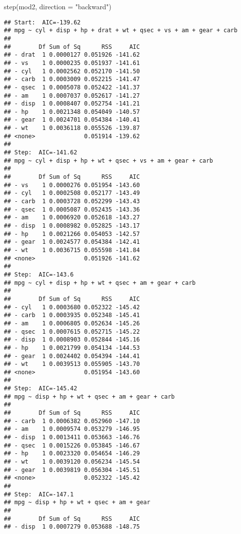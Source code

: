 \documentclass[
]{article}
\newenvironment{Shaded}{\begin{snugshade}}{\end{snugshade}}
\newcommand{\AttributeTok}[1]{\textcolor[rgb]{0.77,0.63,0.00}{#1}}
\newcommand{\FunctionTok}[1]{\textcolor[rgb]{0.00,0.00,0.00}{#1}}
\newcommand{\NormalTok}[1]{#1}
\newcommand{\StringTok}[1]{\textcolor[rgb]{0.31,0.60,0.02}{#1}}
\begin{document}
\begin{Shaded}
\begin{Highlighting}[]
\FunctionTok{step}\NormalTok{(mod2, }\AttributeTok{direction =} \StringTok{"backward"}\NormalTok{)}
\end{Highlighting}
\end{Shaded}

\begin{verbatim}
## Start:  AIC=-139.62
## mpg ~ cyl + disp + hp + drat + wt + qsec + vs + am + gear + carb
## 
##        Df Sum of Sq      RSS     AIC
## - drat  1 0.0000127 0.051926 -141.62
## - vs    1 0.0000235 0.051937 -141.61
## - cyl   1 0.0002562 0.052170 -141.50
## - carb  1 0.0003009 0.052215 -141.47
## - qsec  1 0.0005078 0.052422 -141.37
## - am    1 0.0007037 0.052617 -141.27
## - disp  1 0.0008407 0.052754 -141.21
## - hp    1 0.0021348 0.054049 -140.57
## - gear  1 0.0024701 0.054384 -140.41
## - wt    1 0.0036118 0.055526 -139.87
## <none>              0.051914 -139.62
## 
## Step:  AIC=-141.62
## mpg ~ cyl + disp + hp + wt + qsec + vs + am + gear + carb
## 
##        Df Sum of Sq      RSS     AIC
## - vs    1 0.0000276 0.051954 -143.60
## - cyl   1 0.0002508 0.052177 -143.49
## - carb  1 0.0003728 0.052299 -143.43
## - qsec  1 0.0005087 0.052435 -143.36
## - am    1 0.0006920 0.052618 -143.27
## - disp  1 0.0008982 0.052825 -143.17
## - hp    1 0.0021266 0.054053 -142.57
## - gear  1 0.0024577 0.054384 -142.41
## - wt    1 0.0036715 0.055598 -141.84
## <none>              0.051926 -141.62
## 
## Step:  AIC=-143.6
## mpg ~ cyl + disp + hp + wt + qsec + am + gear + carb
## 
##        Df Sum of Sq      RSS     AIC
## - cyl   1 0.0003680 0.052322 -145.42
## - carb  1 0.0003935 0.052348 -145.41
## - am    1 0.0006805 0.052634 -145.26
## - qsec  1 0.0007615 0.052715 -145.22
## - disp  1 0.0008903 0.052844 -145.16
## - hp    1 0.0021799 0.054134 -144.53
## - gear  1 0.0024402 0.054394 -144.41
## - wt    1 0.0039513 0.055905 -143.70
## <none>              0.051954 -143.60
## 
## Step:  AIC=-145.42
## mpg ~ disp + hp + wt + qsec + am + gear + carb
## 
##        Df Sum of Sq      RSS     AIC
## - carb  1 0.0006382 0.052960 -147.10
## - am    1 0.0009574 0.053279 -146.95
## - disp  1 0.0013411 0.053663 -146.76
## - qsec  1 0.0015226 0.053845 -146.67
## - hp    1 0.0023320 0.054654 -146.29
## - wt    1 0.0039120 0.056234 -145.54
## - gear  1 0.0039819 0.056304 -145.51
## <none>              0.052322 -145.42
## 
## Step:  AIC=-147.1
## mpg ~ disp + hp + wt + qsec + am + gear
## 
##        Df Sum of Sq      RSS     AIC
## - disp  1 0.0007279 0.053688 -148.75

\end{verbatim}
\end{document}
